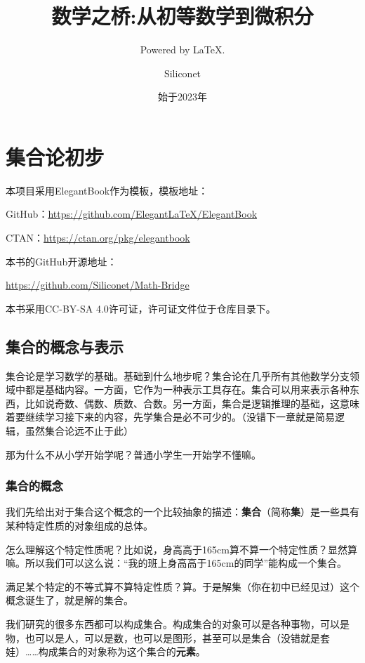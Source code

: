 \documentclass[lang=cn,math=cm,chinesefont=nofont,11pt,scheme=chinese,onecol]{elegantbook}
\title{数学之桥:从初等数学到微积分}
\subtitle{Powered by \LaTeX.}
\author{Siliconet}
\date{始于2023年}
\begin{document}
\maketitle
\frontmatter

\tableofcontents

\mainmatter

\chapter{集合论初步}

本项目采用ElegantBook作为模板，模板地址：

GitHub：\href{https://github.com/ElegantLaTeX/ElegantBook}{https://github.com/ElegantLaTeX/ElegantBook}

CTAN：\href{https://ctan.org/pkg/elegantbook}{https://ctan.org/pkg/elegantbook}

本书的GitHub开源地址：

\href{https://github.com/Siliconet/Math-Bridge}{https://github.com/Siliconet/Math-Bridge}

本书采用CC-BY-SA 4.0许可证，许可证文件位于仓库目录下。

\section{集合的概念与表示}
集合论是学习数学的基础。基础到什么地步呢？集合论在几乎所有其他数学分支领域中都是基础内容。一方面，它作为一种表示工具存在。集合可以用来表示各种东西，比如说奇数、偶数、质数、合数。另一方面，集合是逻辑推理的基础，这意味着要继续学习接下来的内容，先学集合是必不可少的。（没错下一章就是简易逻辑，虽然集合论远不止于此）

那为什么不从小学开始学呢？普通小学生一开始学不懂嘛。

\subsection{集合的概念}

我们先给出对于集合这个概念的一个比较抽象的描述：\textbf{集合}（简称\textbf{集}）是一些具有某种特定性质的对象组成的总体。

怎么理解这个特定性质呢？比如说，身高高于165cm算不算一个特定性质？显然算嘛。所以我们可以这么说：“我的班上身高高于165cm的同学”能构成一个集合。

满足某个特定的不等式算不算特定性质？算。于是解集（你在初中已经见过）这个概念诞生了，就是解的集合。

我们研究的很多东西都可以构成集合。构成集合的对象可以是各种事物，可以是物，也可以是人，可以是数，也可以是图形，甚至可以是集合（没错就是套娃）……构成集合的对象称为这个集合的\textbf{元素}。
\end{document}
